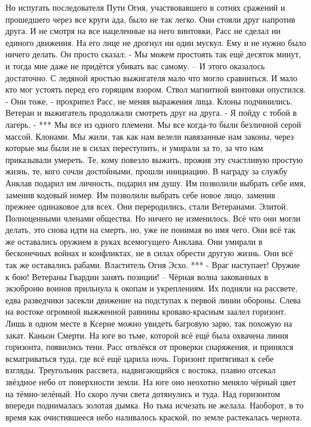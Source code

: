 \documentclass[a4paper, 12pt]{report}
\begin{document}
Но испугать последователя Пути Огня, участвовавшего в сотнях сражений и прошедшего через все круги ада, было не так легко.
Они стояли друг напротив друга. И не смотря на все нацеленные на него винтовки, Расс не сделал ни единого движения. На его лице не дрогнул ни один мускул. Ему и не нужно было ничего делать. Он просто сказал:
	- Мы можем простоять так ещё десяток минут, и тогда мне даже не придётся убивать вас самому. –
	И этого оказалось достаточно.
	С ледяной яростью выжигателя мало что могло сравниться. И мало кто мог устоять перед его горящим взором. Ствол магнитной винтовки опустился.
	- Они тоже, - прохрипел Расс, не меняя выражения лица.
	Клоны подчинились. Ветеран и выжигатель продолжали смотреть друг на друга.
	- Я пойду с тобой в лагерь. -
***
Мы все из одного племени. Мы все когда-то были безличной серой массой. Клонами. Мы жили, так как нам велели навязанные нам законы, через которые мы были не в силах переступить, и умирали за то, за что нам приказывали умереть. Те, кому повезло выжить, прожив эту счастливую простую жизнь, те, кого сочли достойными, прошли инициацию. В награду за службу Анклав подарил им личность, подарил им душу. Им позволили выбрать себе имя, заменив кодовый номер. Им позволили выбрать себе новое лицо, заменив прежнее одинаковое для всех. Они переродились, стали Ветеранами. Элитой. Полноценными членами общества. Но ничего не изменилось. Всё что они могли делать, это снова идти на смерть, но, уже не понимая во имя чего. Они всё так же оставались оружием в руках всемогущего Анклава. Они умирали в бесконечных войнах и конфликтах, не в силах обрести другую жизнь. Они всё так же оставались рабами.
Властитель Огня Эсхо.
***
	- Враг наступает! Оружие к бою! Ветераны Гвардии занять позиции! – 
	Чёрная волна закованных в экзоброню воинов прильнула к окопам и укреплениям. Их подняли на рассвете, едва разведчики засекли движение на подступах к первой линии обороны. Слева на востоке огромной выжженной равнины кроваво-красным заалел горизонт. Лишь в одном месте в Ксерне можно увидеть багровую зарю, так похожую на закат.
	Каньон Смерти.
	На юге во тьме, которой всё ещё была охвачена линия горизонта, появились тени. Расс отвлёкся от проверки снаряжения, и принялся всматриваться туда, где всё ещё царила ночь. Горизонт притягивал к себе взгляды. Треугольник рассвета, надвигающийся с востока, плавно отсекал звёздное небо от поверхности земли. На юге оно неохотно меняло чёрный цвет на тёмно-зелёный. Но скоро лучи света дотянулись и туда. Над горизонтом впереди поднималась золотая дымка. Но тьма исчезать не желала. Наоборот, в то время как очистившееся небо наливалось краской, по земле растекалась чернота.
\end{document}
